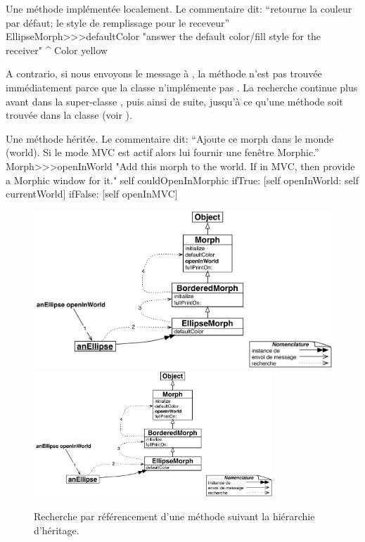 \documentclass[a4paper,10pt,twoside]{book}
\begin{document}
\begin{method}[defaultColor]{Une m\'ethode impl\'ement\'ee localement. Le commentaire dit: ``retourne la couleur par d\'efaut; le style de remplissage pour le receveur''}
EllipseMorph>>>defaultColor
	"answer the default color/fill style for the receiver"
	^ Color yellow
\end{method}

A contrario, si nous envoyons le message  \`a \mbox{,} la m\'ethode n'est pas trouv\'ee imm\'ediatement parce que la classe  n'impl\'emente pas .
La recherche continue plus avant dans la super-classe \mbox{,} puis ainsi de suite, jusqu'\`a ce qu'une m\'ethode  soit trouv\'ee dans la classe  (voir ).

\begin{method}[openInWorld]{Une m\'ethode h\'erit\'ee. Le commentaire dit: ``Ajoute ce morph dans le monde (world). Si le mode MVC est actif alors lui fournir une fen\^etre Morphic.''}
Morph>>>openInWorld
	"Add this morph to the world.  If in MVC, then provide a Morphic window for it."
	self couldOpenInMorphic
		ifTrue: [self openInWorld: self currentWorld]
		ifFalse: [self openInMVC]
\end{method}

\begin{figure}[htb]
\begin{center}
\ifluluelse
	{\includegraphics[width=\textwidth]{openInWorldLookup}}
	{\includegraphics[width=0.8\textwidth]{openInWorldLookup}}
\caption{Recherche par r\'ef\'erencement d'une m\'ethode suivant la hi\'erarchie d'h\'eritage.\label{fig:openInWorldLookup}}
\end{center}
\end{figure}
\end{document}
